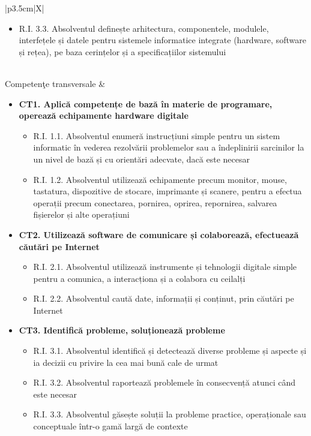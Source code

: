 \documentclass[11pt,a4paper]{article}
\begin{document}
\begin{xltabular}{\textwidth}{|p{3.5cm}|X|}
\begin{itemize}[leftmargin=*]
\begin{itemize}
            \item R.I. 3.3. Absolventul definește arhitectura, componentele, modulele, interfețele și datele pentru sistemele informatice integrate (hardware, software și rețea), pe baza cerințelor și a specificațiilor sistemului
        \end{itemize}
\end{itemize}
\vspace{-0.3cm}
\\ \hline
Competenţe transversale & 
\vspace{-0.3cm}
\begin{itemize}[leftmargin=*]
    \item \textbf{CT1. Aplică competențe de bază în materie de programare, operează echipamente hardware digitale}
    \begin{itemize}
            \item R.I. 1.1. Absolventul enumeră instrucțiuni simple pentru un sistem informatic în vederea rezolvării problemelor sau a îndeplinirii sarcinilor la un nivel de bază și cu orientări adecvate, dacă este necesar
            \item R.I. 1.2. Absolventul utilizează echipamente precum monitor, mouse, tastatura, dispozitive de stocare, imprimante și scanere, pentru a efectua operații precum conectarea, pornirea, oprirea, repornirea, salvarea fișierelor și alte operațiuni
        \end{itemize}
    \item \textbf{CT2. Utilizează software de comunicare și colaborează, efectuează căutări pe Internet}
    \begin{itemize}
            \item R.I. 2.1. Absolventul utilizează instrumente și tehnologii digitale simple pentru a comunica, a interacționa și a colabora cu ceilalți
            \item R.I. 2.2. Absolventul caută date, informații și conținut, prin căutări pe Internet
        \end{itemize}
    \item \textbf{CT3. Identifică probleme, soluționează probleme}
    \begin{itemize}
            \item R.I. 3.1. Absolventul identifică și detectează diverse probleme și aspecte și ia decizii cu privire la cea mai bună cale de urmat
            \item R.I. 3.2. Absolventul raportează problemele în consecvență atunci când este necesar
            \item R.I. 3.3. Absolventul găsește soluții la probleme practice, operaționale sau conceptuale într-o gamă largă de contexte

\end{itemize}
\end{itemize}
\end{xltabular}
\end{document}
